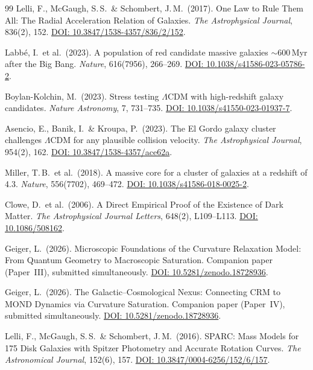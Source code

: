 \documentclass[aps,prd,twocolumn,superscriptaddress,nofootinbib,floatfix]{revtex4-2}
\begin{document}
\begin{thebibliography}{99}
Lelli, F., McGaugh, S.\,S.\ \& Schombert, J.\,M.\ (2017).
One Law to Rule Them All: The Radial Acceleration Relation of Galaxies.
\textit{The Astrophysical Journal}, 836(2), 152.
\href{https://doi.org/10.3847/1538-4357/836/2/152}{DOI: 10.3847/1538-4357/836/2/152}.

Labb\'e, I.\ et al.\ (2023).
A population of red candidate massive galaxies $\sim$600\,Myr after the Big Bang.
\textit{Nature}, 616(7956), 266--269.
\href{https://doi.org/10.1038/s41586-023-05786-2}{DOI: 10.1038/s41586-023-05786-2}.

Boylan-Kolchin, M.\ (2023).
Stress testing $\Lambda$CDM with high-redshift galaxy candidates.
\textit{Nature Astronomy}, 7, 731--735.
\href{https://doi.org/10.1038/s41550-023-01937-7}{DOI: 10.1038/s41550-023-01937-7}.

Asencio, E., Banik, I.\ \& Kroupa, P.\ (2023).
The El Gordo galaxy cluster challenges $\Lambda$CDM for any plausible collision velocity.
\textit{The Astrophysical Journal}, 954(2), 162.
\href{https://doi.org/10.3847/1538-4357/ace62a}{DOI: 10.3847/1538-4357/ace62a}.

Miller, T.\,B.\ et al.\ (2018).
A massive core for a cluster of galaxies at a redshift of 4.3.
\textit{Nature}, 556(7702), 469--472.
\href{https://doi.org/10.1038/s41586-018-0025-2}{DOI: 10.1038/s41586-018-0025-2}.

Clowe, D.\ et al.\ (2006).
A Direct Empirical Proof of the Existence of Dark Matter.
\textit{The Astrophysical Journal Letters}, 648(2), L109--L113.
\href{https://doi.org/10.1086/508162}{DOI: 10.1086/508162}.

Geiger, L.\ (2026).
Microscopic Foundations of the Curvature Relaxation Model: From Quantum Geometry to Macroscopic Saturation.
Companion paper (Paper~III), submitted simultaneously.
\href{https://doi.org/10.5281/zenodo.18728936}{DOI: 10.5281/zenodo.18728936}.

Geiger, L.\ (2026).
The Galactic--Cosmological Nexus: Connecting CRM to MOND Dynamics via Curvature Saturation.
Companion paper (Paper~IV), submitted simultaneously.
\href{https://doi.org/10.5281/zenodo.18728936}{DOI: 10.5281/zenodo.18728936}.

Lelli, F., McGaugh, S.\,S.\ \& Schombert, J.\,M.\ (2016).
SPARC: Mass Models for 175 Disk Galaxies with Spitzer Photometry and Accurate Rotation Curves.
\textit{The Astronomical Journal}, 152(6), 157.
\href{https://doi.org/10.3847/0004-6256/152/6/157}{DOI: 10.3847/0004-6256/152/6/157}.


\end{thebibliography}
\end{document}
